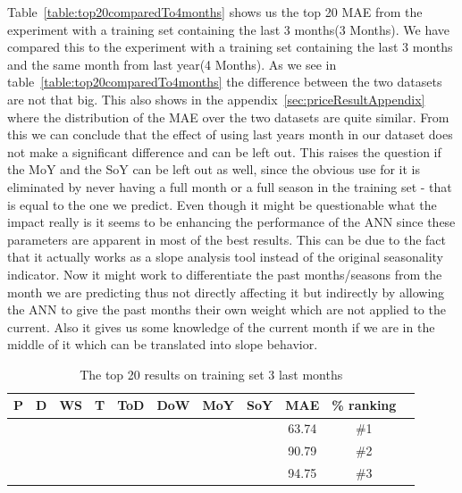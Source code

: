 Table~\ref{table:top20comparedTo4months} shows us the top 20 MAE from the experiment with a training set containing the last 3 months(3 Months). We have compared this to the experiment with a training set containing the last 3 months and the same month from last year(4 Months). As we see in table~\ref{table:top20comparedTo4months} the difference between the two datasets are not that big. This also shows in the appendix~\ref{sec:priceResultAppendix} where the distribution of the MAE over the two datasets are quite similar. From this we can conclude that the effect of using last years month in our dataset does not make a significant difference and can be left out. This raises the question if the MoY and the SoY can be left out as well, since the obvious use for it is eliminated by never having a full month or a full season in the training set - that is equal to the one we predict. Even though it might be questionable what the impact really is it seems to be enhancing the performance of the ANN since these parameters are apparent in most of the best results. This can be due to the fact that it actually works as a slope analysis tool instead of the original seasonality indicator. Now it might work to differentiate the past months/seasons from the month we are predicting thus not directly affecting it but indirectly by allowing the ANN to give the past months their own weight which are not applied to the current. Also it gives us some knowledge of the current month if we are in the middle of it which can be translated into slope behavior.

\begin{table}[H]
\centering  %
\begin{tabular}{|c|c|c|c|c|c|c|c|c|c|c|} %
\hline
P & D & WS & T & ToD & DoW & MoY & SoY & MAE & \% ranking\\ [0.5ex] %
\hline
\x    & \x    & \x    & \x    & \x\m  & \x\m  & \x\m  &       & 63.74 & \#1 \\ \hline
\x    & \x    & \x    & \x    & \x\m  & \x\m  &       &       & 90.79 & \#2 \\ \hline
\x    & \x    & \x    & \x    & \x\m  & \x\m  &       & \x\m  & 94.75 & \#3 \\ \hline
\end{tabular}
\caption{The top 20 results on training set 3 last months} %
\label{table:1YearTrain} %
\end{table}

